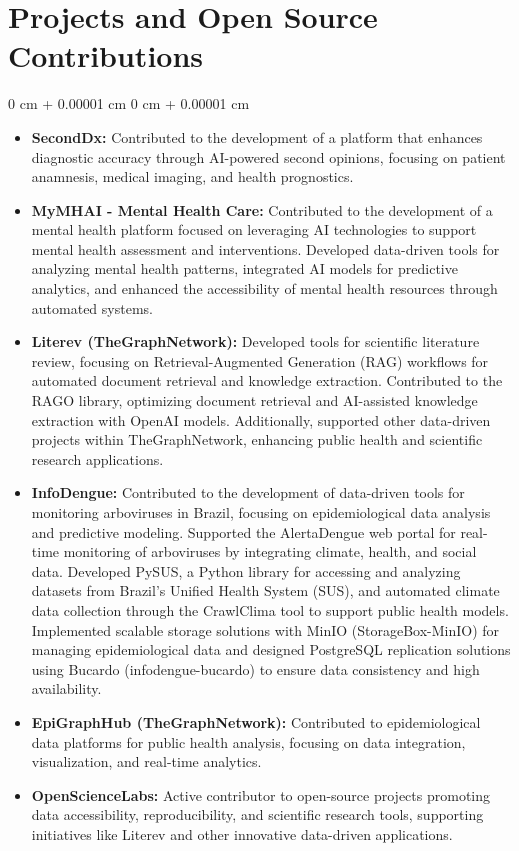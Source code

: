 \documentclass[10pt, letterpaper]{article}
\newenvironment{highlights}{
    \begin{itemize}[
        topsep=0.10 cm,
        parsep=0.10 cm,
        partopsep=0pt,
        itemsep=0pt,
        leftmargin=0 cm + 10pt
    ]
}{
    \end{itemize}
} %
\newenvironment{onecolentry}{
    \begin{adjustwidth}{
        0 cm + 0.00001 cm
    }{
        0 cm + 0.00001 cm
    }
}{
    \end{adjustwidth}
} %
\begin{document}
    \section{Projects and Open Source Contributions}
        \vspace{0.10 cm}
        \begin{onecolentry}
            \begin{highlights}

        \item \textbf{SecondDx:} Contributed to the development of a platform that enhances diagnostic accuracy through AI-powered second opinions, focusing on patient anamnesis, medical imaging, and health prognostics.
        \item \textbf{MyMHAI - Mental Health Care:} Contributed to the development of a mental health platform focused on leveraging AI technologies to support mental health assessment and interventions. Developed data-driven tools for analyzing mental health patterns, integrated AI models for predictive analytics, and enhanced the accessibility of mental health resources through automated systems.
        \item \textbf{Literev (TheGraphNetwork):} Developed tools for scientific literature review, focusing on Retrieval-Augmented Generation (RAG) workflows for automated document retrieval and knowledge extraction. Contributed to the RAGO library, optimizing document retrieval and AI-assisted knowledge extraction with OpenAI models. Additionally, supported other data-driven projects within TheGraphNetwork, enhancing public health and scientific research applications.
        \item \textbf{InfoDengue:} Contributed to the development of data-driven tools for monitoring arboviruses in Brazil, focusing on epidemiological data analysis and predictive modeling. Supported the AlertaDengue web portal for real-time monitoring of arboviruses by integrating climate, health, and social data. Developed PySUS, a Python library for accessing and analyzing datasets from Brazil's Unified Health System (SUS), and automated climate data collection through the CrawlClima tool to support public health models. Implemented scalable storage solutions with MinIO (StorageBox-MinIO) for managing epidemiological data and designed PostgreSQL replication solutions using Bucardo (infodengue-bucardo) to ensure data consistency and high availability.
        \item \textbf{EpiGraphHub (TheGraphNetwork):} Contributed to epidemiological data platforms for public health analysis, focusing on data integration, visualization, and real-time analytics.
        \item \textbf{OpenScienceLabs:} Active contributor to open-source projects promoting data accessibility, reproducibility, and scientific research tools, supporting initiatives like Literev and other innovative data-driven applications.                    
                                
            \end{highlights}
        \end{onecolentry}
\end{document}
